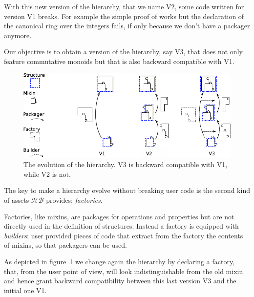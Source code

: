 \documentclass[a4paper,UKenglish,cleveref, autoref]{lipics-v2019}
\newcommand{\HB}{\ensuremath{\mathcal{HB}}}
\begin{document}
With this new version of the hierarchy, that we name V2, some code written
for version V1 breaks. For example the simple proof of  works
but the declaration of the canonical ring over the integers fails, if only
because we don't have a  packager anymore.

Our objective is to obtain a version of the hierarchy, say V3, that does
not only feature commutative monoids but that is also backward compatible
with V1.

\begin{figure}[!h]
  \begin{center}
    \includegraphics[width=\textwidth]{puzzle.pdf}
  \end{center}
  \caption{\label{fig:puzzle}The evolution of the hierarchy. V3 is backward compatible with V1, while V2 is not.}
\end{figure}

The key to make a hierarchy evolve without breaking user code is the second
kind of assets \HB{} provides: \emph{factories}.

Factories, like mixins, are packages for operations and properties but are
not directly used in the definition of structures. Instead a factory is
equipped with \emph{builders}: user provided pieces of code that extract
from the factory the contents of mixins, so that packagers can be used.

As depicted in figure~\ref{fig:puzzle} we change again the hierarchy
by declaring a  factory, that, from the user point of view,
will look indistinguishable from the old  mixin
and hence grant backward compatibility between this last version V3 and the
initial one V1.
\end{document}
